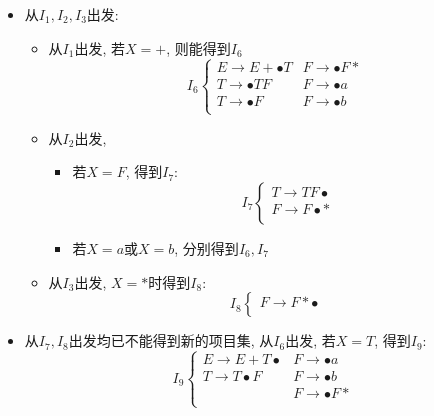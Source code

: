 \documentclass[UTF8]{article}
\newcommand{\blt}{\bullet}
\begin{document}
\begin{itemize}
\begin{itemize}
\begin{itemize}
$$\begin{array}{ll}
		F\rightarrow F\blt * \\
		\end{array}\right.$$
		\item 对$X=a$或$X=a$, 得到$I_4$, $I_5$:
		$$\begin{array}{ll}
		I_4: & \left\{F\rightarrow a\blt \right.\\
		\\
		I_5: & \left\{ F\rightarrow b\blt \right.\\
		\end{array}$$
		\end{itemize}
	\item 从$I_1, I_2, I_3$出发:
		\begin{itemize}
		\item 从$I_1$出发, 若$X=+$, 则能得到$I_6$
			$$I_6\left\{\begin{array}{ll}
			E\rightarrow E+\blt T & F\rightarrow\blt F* \\
			T\rightarrow\blt TF & F\rightarrow\blt a \\
			T\rightarrow\blt F & F\rightarrow\blt b \\
			\end{array}\right.$$
		\item 从$I_2$出发, 
			\begin{itemize}
			\item 若$X=F$, 得到$I_7$:
				$$I_7\left\{\begin{array}{ll}
				T\rightarrow TF\blt \\
				F\rightarrow F\blt * \\
				\end{array}\right.$$
			\item 若$X=a$或$X=b$, 分别得到$I_6, I_7$
			\end{itemize}
		\item 从$I_3$出发, $X=*$时得到$I_8$:
			$$I_8\left\{\begin{array}{ll}
			F\rightarrow F *\blt \\
			\end{array}\right.$$
		\end{itemize}
	\item 从$I_7, I_8$出发均已不能得到新的项目集, 从$I_6$出发, 若$X=T$, 得到$I_9$:
		$$I_9\left\{\begin{array}{ll}
		E\rightarrow E+T\blt & F\rightarrow\blt a \\
		T\rightarrow T\blt F & F\rightarrow\blt b \\
		& F\rightarrow\blt F* \\
		\end{array}\right.$$
	\end{itemize}


\end{itemize}
\end{document}
